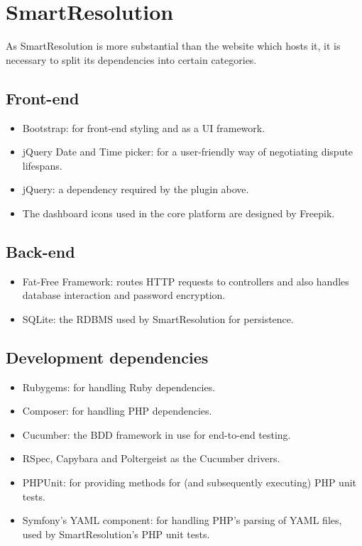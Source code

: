 \section{SmartResolution}

As SmartResolution is more substantial than the website which hosts it, it is necessary to split its dependencies into certain categories.

\subsection{Front-end}

\begin{itemize}
\item Bootstrap: for front-end styling and as a UI framework.
\item jQuery Date and Time picker: for a user-friendly way of negotiating dispute lifespans.
\item jQuery: a dependency required by the plugin above.
\item The dashboard icons used in the core platform are designed by Freepik.
\end{itemize}

\subsection{Back-end}

\begin{itemize}
\item Fat-Free Framework: routes HTTP requests to controllers and also handles database interaction and password encryption.
\item SQLite: the RDBMS used by SmartResolution for persistence.
\end{itemize}

\subsection{Development dependencies}

\begin{itemize}
\item Rubygems: for handling Ruby dependencies.
\item Composer: for handling PHP dependencies.
\item Cucumber: the BDD framework in use for end-to-end testing.
\item RSpec, Capybara and Poltergeist as the Cucumber drivers.
\item PHPUnit: for providing methods for (and subsequently executing) PHP unit tests.
\item Symfony's YAML component: for handling PHP's parsing of YAML files, used by SmartResolution's PHP unit tests.
\end{itemize}

